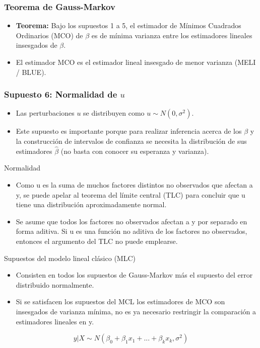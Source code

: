 \documentclass{beamer}
\begin{document}
\begin{frame}
\frametitle{Teorema de Gauss-Markov}
\begin{itemize}
    \item \textbf{Teorema:} Bajo los supuestos 1 a 5, el estimador de Mínimos Cuadrados Ordinarios (MCO) de $\beta$ es de mínima varianza entre los estimadores lineales insesgados de $\beta$.
    \item El estimador MCO es el estimador lineal insesgado de menor varianza (MELI / BLUE).
\end{itemize}
\end{frame}

\begin{frame}
\frametitle{Supuesto 6: Normalidad de $u$}
\begin{itemize}
    \item Las perturbaciones $u$ se distribuyen como $u \sim N(0, \sigma^2)$.
    \item Este supuesto es importante porque para realizar inferencia acerca de los $\beta$ y la construcción de intervalos de confianza se necesita la distribución de sus estimadores $\hat{\beta}$ (no basta con conocer su esperanza y varianza).
\end{itemize}
\end{frame}

\begin{frame}{Normalidad}
\begin{itemize}
    \item  Como u es la suma de muchos factores distintos no observados que afectan a y, se puede apelar
al teorema del límite central (TLC)  para concluir que u tiene una distribución
aproximadamente normal.

\item Se asume que todos los factores
no observados afectan a y por separado en forma aditiva.  Si u
es una  función no aditiva de los factores no observados, entonces el argumento del TLC no
puede emplearse.
\end{itemize}
\end{frame}
\begin{frame}{Supuestos del modelo lineal clásico (MLC)}

\begin{itemize}
\item Consisten en todos los supuestos de Gauss-Markov más el supuesto  del error
distribuido normalmente.
    \item Si se satisfacen los supuestos del MCL los estimadores de MCO son insesgados de varianza mínima, no es ya necesario restringir la
comparación a estimadores lineales en y.
\end{itemize}

{\color{blue} $$ y|X\sim N(\beta_0+\beta_1x_1+...+\beta_kx_k, \sigma^2)$$}
    
\end{frame}
\end{document}

